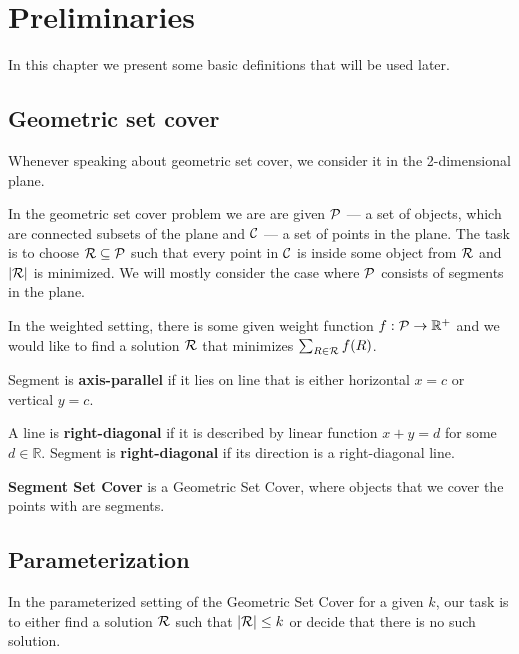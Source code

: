 \chapter{Preliminaries}

In this chapter we present some basic definitions that
will be used later.

\section{Geometric set cover}
\label{section:def:geometric__set_cover}
Whenever speaking about geometric set cover,
we consider it in the 2-dimensional plane.

In the geometric set cover problem we are are given
$\mathcal{P}$ --- a set of objects, which are connected
subsets of the plane and $\mathcal{C}$ --- a set of points in the plane.
The task is to choose $\mathcal{R} \subseteq \mathcal{P}$ such that
every point in $\mathcal{C}$ is inside some object from $\mathcal{R}$
and $|\mathcal{R}|$ is minimized. We will mostly consider the case where
$\mathcal{P}$ consists of segments in the plane.

In the weighted setting, there is some given weight function
$f : \mathcal{P} \rightarrow \mathbb{R^+}$
and we would like to find a solution $\mathcal{R}$
that minimizes $\sum_{R \in \mathcal{R}} f(R)$.

\begin{defi}
Segment is \textbf{axis-parallel} if it lies on line that is
either horizontal $x = c$ or vertical $y = c$.
\end{defi}

\begin{defi}
	A line is \textbf{right-diagonal} if it is
	described by linear function $x + y = d$ for some $d \in \mathbb{R}$.
	Segment is \textbf{right-diagonal} if its
	direction is a right-diagonal line.
\end{defi}

\begin{defi}
\textbf{Segment Set Cover} is a Geometric Set Cover, where
objects that we cover the points with are segments.
\end{defi}

\section{Parameterization}

In the parameterized setting of the Geometric Set Cover
for a given $k$,
our task is to either find a solution $\mathcal{R}$ such that $|\mathcal{R}| \le k$
or decide that there is no such solution.

